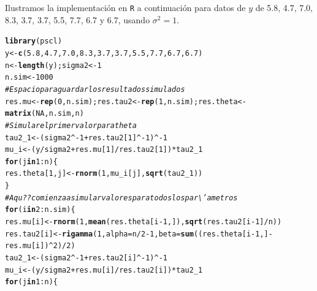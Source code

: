 \documentclass[10pt,openright]{book}\usepackage[]{graphicx}\usepackage[]{color}
\makeatletter
\newcommand{\hlnum}[1]{\textcolor[rgb]{0.686,0.059,0.569}{#1}}%
\newcommand{\hlcom}[1]{\textcolor[rgb]{0.678,0.584,0.686}{\textit{#1}}}%
\newcommand{\hlopt}[1]{\textcolor[rgb]{0,0,0}{#1}}%
\newcommand{\hlstd}[1]{\textcolor[rgb]{0.345,0.345,0.345}{#1}}%
\newcommand{\hlkwa}[1]{\textcolor[rgb]{0.161,0.373,0.58}{\textbf{#1}}}%
\newcommand{\hlkwb}[1]{\textcolor[rgb]{0.69,0.353,0.396}{#1}}%
\newcommand{\hlkwc}[1]{\textcolor[rgb]{0.333,0.667,0.333}{#1}}%
\newcommand{\hlkwd}[1]{\textcolor[rgb]{0.737,0.353,0.396}{\textbf{#1}}}%
\newenvironment{kframe}{%
 \def\at@end@of@kframe{}%
 \ifinner\ifhmode%
  \def\at@end@of@kframe{\end{minipage}}%
  \begin{minipage}{\columnwidth}%
 \fi\fi%
 \def\FrameCommand##1{\hskip\@totalleftmargin \hskip-\fboxsep
 \colorbox{shadecolor}{##1}\hskip-\fboxsep
     \hskip-\linewidth \hskip-\@totalleftmargin \hskip\columnwidth}%
 \MakeFramed {\advance\hsize-\width
   \@totalleftmargin\z@ \linewidth\hsize
   \@setminipage}}%
 {\par\unskip\endMakeFramed%
 \at@end@of@kframe}
\newenvironment{knitrout}{}{} %
\makeatother
\begin{document}
Ilustramos la implementaci\'on en \verb'R' a continuaci\'on para datos de $y$ de 5.8, 4.7, 7.0, 8.3, 3.7, 3.7, 5.5, 7.7, 6.7 y 6.7, usando $\sigma^2=1$.
\begin{knitrout}
\color{fgcolor}\begin{kframe}
\begin{alltt}
\hlkwd{library}\hlstd{(pscl)}
\hlstd{y} \hlkwb{<-} \hlkwd{c}\hlstd{(}\hlnum{5.8}\hlstd{,} \hlnum{4.7}\hlstd{,} \hlnum{7.0}\hlstd{,} \hlnum{8.3}\hlstd{,} \hlnum{3.7}\hlstd{,} \hlnum{3.7}\hlstd{,} \hlnum{5.5}\hlstd{,} \hlnum{7.7}\hlstd{,} \hlnum{6.7}\hlstd{,} \hlnum{6.7}\hlstd{)}
\hlstd{n} \hlkwb{<-} \hlkwd{length}\hlstd{(y); sigma2} \hlkwb{<-} \hlnum{1}
\hlstd{n.sim} \hlkwb{<-} \hlnum{1000}
\hlcom{# Espacio para guardar los resultados simulados}
\hlstd{res.mu} \hlkwb{<-} \hlkwd{rep}\hlstd{(}\hlnum{0}\hlstd{, n.sim); res.tau2} \hlkwb{<-} \hlkwd{rep}\hlstd{(}\hlnum{1}\hlstd{, n.sim); res.theta}\hlkwb{<-} \hlkwd{matrix}\hlstd{(}\hlnum{NA}\hlstd{, n.sim, n)}
\hlcom{# Simular el primer valor para theta}
\hlstd{tau2_1} \hlkwb{<-} \hlstd{(sigma2}\hlopt{^-}\hlnum{1} \hlopt{+} \hlstd{res.tau2[}\hlnum{1}\hlstd{]}\hlopt{^-}\hlnum{1}\hlstd{)}\hlopt{^-}\hlnum{1}
\hlstd{mu_i} \hlkwb{<-} \hlstd{(y}\hlopt{/}\hlstd{sigma2} \hlopt{+} \hlstd{res.mu[}\hlnum{1}\hlstd{]}\hlopt{/}\hlstd{res.tau2[}\hlnum{1}\hlstd{])}\hlopt{*}\hlstd{tau2_1}
\hlkwa{for}\hlstd{(j} \hlkwa{in} \hlnum{1}\hlopt{:}\hlstd{n)\{}
  \hlstd{res.theta[}\hlnum{1}\hlstd{,j]} \hlkwb{<-} \hlkwd{rnorm}\hlstd{(}\hlnum{1}\hlstd{, mu_i[j],} \hlkwd{sqrt}\hlstd{(tau2_1))}
\hlstd{\}}
\hlcom{# Aqu?? comienza a simular valores para todos los par\textbackslash{}'ametros}
\hlkwa{for}\hlstd{(i} \hlkwa{in} \hlnum{2}\hlopt{:}\hlstd{n.sim)\{}
  \hlstd{res.mu[i]} \hlkwb{<-} \hlkwd{rnorm}\hlstd{(}\hlnum{1}\hlstd{,} \hlkwd{mean}\hlstd{(res.theta[i}\hlopt{-}\hlnum{1}\hlstd{,]),} \hlkwd{sqrt}\hlstd{(res.tau2[i}\hlopt{-}\hlnum{1}\hlstd{]}\hlopt{/}\hlstd{n))}
  \hlstd{res.tau2[i]} \hlkwb{<-} \hlkwd{rigamma}\hlstd{(}\hlnum{1}\hlstd{,} \hlkwc{alpha}\hlstd{=n}\hlopt{/}\hlnum{2}\hlopt{-}\hlnum{1}\hlstd{,} \hlkwc{beta}\hlstd{=}\hlkwd{sum}\hlstd{((res.theta[i}\hlopt{-}\hlnum{1}\hlstd{,]}\hlopt{-}\hlstd{res.mu[i])}\hlopt{^}\hlnum{2}\hlstd{)}\hlopt{/}\hlnum{2}\hlstd{)}
  \hlstd{tau2_1} \hlkwb{<-} \hlstd{(sigma2}\hlopt{^-}\hlnum{1} \hlopt{+} \hlstd{res.tau2[i]}\hlopt{^-}\hlnum{1}\hlstd{)}\hlopt{^-}\hlnum{1}
  \hlstd{mu_i} \hlkwb{<-} \hlstd{(y}\hlopt{/}\hlstd{sigma2} \hlopt{+} \hlstd{res.mu[i]}\hlopt{/}\hlstd{res.tau2[i])}\hlopt{*}\hlstd{tau2_1}
  \hlkwa{for}\hlstd{(j} \hlkwa{in} \hlnum{1}\hlopt{:}\hlstd{n)\{}

\end{alltt}
\end{kframe}
\end{knitrout}
\end{document}
